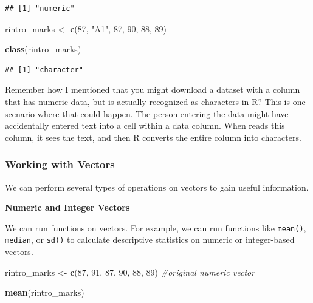 \documentclass[
]{book}
\newenvironment{Shaded}{\begin{snugshade}}{\end{snugshade}}
\newcommand{\CommentTok}[1]{\textcolor[rgb]{0.56,0.35,0.01}{\textit{#1}}}
\newcommand{\DecValTok}[1]{\textcolor[rgb]{0.00,0.00,0.81}{#1}}
\newcommand{\FunctionTok}[1]{\textcolor[rgb]{0.13,0.29,0.53}{\textbf{#1}}}
\newcommand{\NormalTok}[1]{#1}
\newcommand{\OtherTok}[1]{\textcolor[rgb]{0.56,0.35,0.01}{#1}}
\newcommand{\StringTok}[1]{\textcolor[rgb]{0.31,0.60,0.02}{#1}}
\begin{document}
\begin{verbatim}
## [1] "numeric"
\end{verbatim}

\begin{Shaded}
\begin{Highlighting}[]
\NormalTok{rintro\_marks }\OtherTok{\textless{}{-}} \FunctionTok{c}\NormalTok{(}\DecValTok{87}\NormalTok{, }\StringTok{"A1"}\NormalTok{, }\DecValTok{87}\NormalTok{, }\DecValTok{90}\NormalTok{, }\DecValTok{88}\NormalTok{, }\DecValTok{89}\NormalTok{)}


\FunctionTok{class}\NormalTok{(rintro\_marks)}
\end{Highlighting}
\end{Shaded}

\begin{verbatim}
## [1] "character"
\end{verbatim}

Remember how I mentioned that you might download a dataset with a column that has numeric data, but is actually recognized as characters in R? This is one scenario where that could happen. The person entering the data might have accidentally entered text into a cell within a data column. When reads this column, it sees the text, and then R converts the entire column into characters.

\hypertarget{working-with-vectors}{%
\subsubsection{Working with Vectors}\label{working-with-vectors}}

We can perform several types of operations on vectors to gain useful information.

\textbf{Numeric and Integer Vectors}

We can run functions on vectors. For example, we can run functions like \texttt{mean()}, \texttt{median}, or \texttt{sd()} to calculate descriptive statistics on numeric or integer-based vectors.

\begin{Shaded}
\begin{Highlighting}[]
\NormalTok{rintro\_marks }\OtherTok{\textless{}{-}} \FunctionTok{c}\NormalTok{(}\DecValTok{87}\NormalTok{, }\DecValTok{91}\NormalTok{, }\DecValTok{87}\NormalTok{, }\DecValTok{90}\NormalTok{, }\DecValTok{88}\NormalTok{, }\DecValTok{89}\NormalTok{) }\CommentTok{\#original numeric vector}

\FunctionTok{mean}\NormalTok{(rintro\_marks)}
\end{Highlighting}
\end{Shaded}
\end{document}
